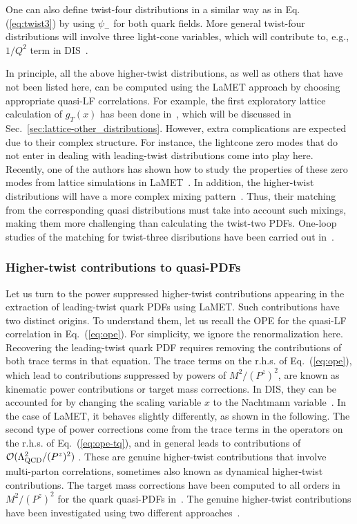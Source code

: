 \documentclass[aps,rmp,reprint,amsmath,amssymb,graphicx,longbibliography]{revtex4-1} %
\DeclareRobustCommand{\eq}[1]{Eq.~(\ref{eq:#1})}
\DeclareRobustCommand{\sec}[1]{Sec.~\ref{sec:#1}}
\begin{document}
One can also define twist-four distributions in a similar way as in Eq. (\ref{eq:twist3})
by using $\psi_-$ for both quark fields. More general twist-four distributions
will involve three light-cone variables, which will contribute to, e.g.,
$1/Q^2$ term in DIS~\cite{Jaffe:1982pm,Ellis:1982cd,Jaffe:1991ra,Ji:1993ey}.

In principle, all the above higher-twist distributions, as well as others that have not been listed here, can be
computed using the LaMET approach by choosing appropriate quasi-LF correlations. For example, the first exploratory lattice calculation of $g_T(x)$ has been done in~\cite{Bhattacharya:2020cen}, which will be discussed in \sec{lattice-other_distributions}. However, extra complications are expected due to their complex structure. For instance, the lightcone zero modes that do not enter in dealing with leading-twist distributions come into play here. Recently, one of the authors has shown how to study the properties of these zero modes from lattice simulations in LaMET~\cite{Ji:2020baz}. In addition, the higher-twist distributions will have a more complex mixing pattern~\cite{Ji:1990br,Balitsky:1996uh}. Thus,
their matching from the corresponding quasi distributions must take into account such
mixings, making them more challenging than calculating the twist-two PDFs.  One-loop studies of the matching for twist-three disributions have been carried out in~\cite{Bhattacharya:2020xlt,Bhattacharya:2020jfj}.


\subsubsection{Higher-twist contributions to quasi-PDFs}

Let us turn to the power suppressed higher-twist contributions appearing in the extraction of leading-twist quark PDFs using LaMET. Such contributions have two distinct origins. To understand them, let us recall the OPE for the quasi-LF correlation in \eq{ope}. For simplicity, we ignore the renormalization here.
%
Recovering the leading-twist quark PDF requires removing the contributions of both trace terms in that equation.
The trace terms on the r.h.s. of \eq{ope}, which lead to contributions suppressed by powers of $M^2/(P^z)^2$, are known as kinematic power contributions or target mass corrections. In DIS, they can be accounted for by changing the scaling variable $x$ to the Nachtmann variable~\cite{Nachtmann:1973mr}. In the case of LaMET, it behaves slightly differently, as shown in the following. The second type of power corrections come from the trace terms in the operators on the r.h.s. of \eq{ope-tq}, and in general leads to contributions of $\mathcal O(\Lambda^2_{\rm{QCD}}/(P^z)^2)$ . These are genuine higher-twist contributions that involve multi-parton correlations, sometimes also known as dynamical higher-twist contributions. The target mass corrections have been computed to all orders in $M^2/(P^z)^2$ for the quark quasi-PDFs in~\cite{Chen:2016utp,Radyushkin:2017ffo}. The genuine higher-twist contributions have been investigated using two different approaches~\cite{Chen:2016utp,Braun:2018brg}.
\end{document}

